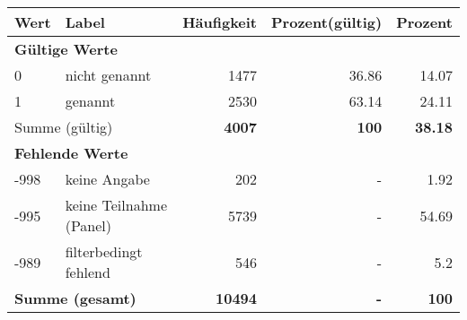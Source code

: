      \begin{longtable}{lXrrr}
     \toprule
     \textbf{Wert} & \textbf{Label} & \textbf{Häufigkeit} & \textbf{Prozent(gültig)} & \textbf{Prozent} \\
     \endhead
     \midrule
     \multicolumn{5}{l}{\textbf{Gültige Werte}}\\

     0 &
     \multicolumn{1}{X}{ nicht genannt   } &


       \num{1477} &
       \num[round-mode=places,round-precision=2]{36,86} &
         \num[round-mode=places,round-precision=2]{14,07} \\

     1 &
     \multicolumn{1}{X}{ genannt   } &


       \num{2530} &
       \num[round-mode=places,round-precision=2]{63,14} &
         \num[round-mode=places,round-precision=2]{24,11} \\
     \midrule
     \multicolumn{2}{l}{Summe (gültig)} &
       \textbf{\num{4007}} &
     \textbf{100} &
       \textbf{\num[round-mode=places,round-precision=2]{38,18}} \\
     \multicolumn{5}{l}{\textbf{Fehlende Werte}}\\
       -998 &
       keine Angabe &
         \num{202} &
        - &
         \num[round-mode=places,round-precision=2]{1,92} \\
       -995 &
       keine Teilnahme (Panel) &
         \num{5739} &
        - &
         \num[round-mode=places,round-precision=2]{54,69} \\
       -989 &
       filterbedingt fehlend &
         \num{546} &
        - &
         \num[round-mode=places,round-precision=2]{5,2} \\
     \midrule
     \multicolumn{2}{l}{\textbf{Summe (gesamt)}} &
          \textbf{\num{10494}} &
        \textbf{-} &
        \textbf{100} \\
     \bottomrule
     \end{longtable}
     
